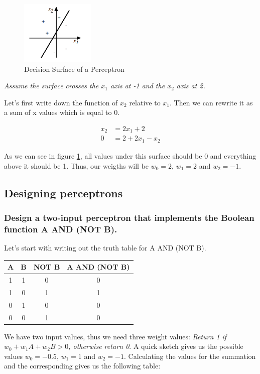 \documentclass{article}
\begin{document}
\begin{figure}
\begin{center}
	\includegraphics[width=100pt]{perceptron1.png}
\end{center}
	\caption{Decision Surface of a Perceptron}
	\label{fig:perc}
\end{figure}

\textit{Assume the surface crosses the $x_1$ axis at -1 and the $x_2$ axis at 2.}

Let's first write down the function of $x_2$ relative to $x_1$. Then we can rewrite it as a sum of x values which is equal to 0.

\begin{align*}
x_2 &= 2x_1 + 2\\
0&=2+2x_1-x_2
\end{align*}

As we can see in figure \ref{fig:perc}, all values under this surface should be 0 and everything above it should be 1. Thus, our weigths will be $w_0 = 2$, $w_1 = 2$ and $w_2 = -1$.

\subsection{Designing perceptrons}
\subsubsection{Design a two-input perceptron that implements the Boolean function A AND (NOT B).}

Let's start with writing out the truth table for A AND (NOT B).

\begin{table}[h!]
\centering
\begin{tabular}{c c c c}
 A & B & NOT B & A AND (NOT B)\\
\hline
1&1&0&0\\
1&0&1&1\\
0&1&0&0\\
0&0&1&0
\end{tabular}
\end{table}

We have two input values, thus we need three weight values: \textit{Return 1 if $w_0 + w_1A + w_2 B > 0$, otherwise return 0}. A quick sketch gives us the possible values $w_0 = -0.5$, $w_1 = 1$ and $w_2 = -1$. Calculating the values for the summation and the corresponding gives us the following table:
\end{document}
